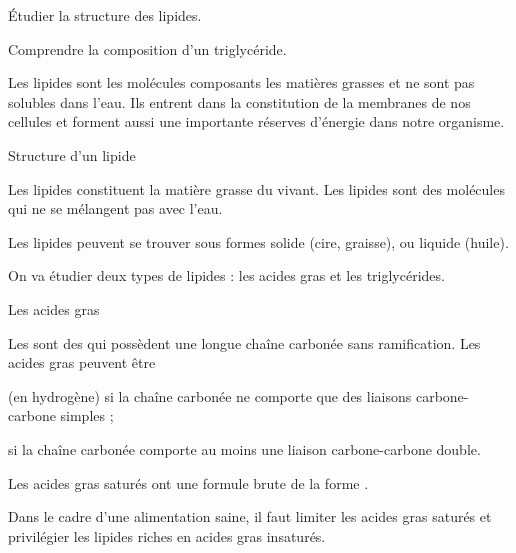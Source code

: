 \tetePremStssBiol
\vspace*{-36pt}


\begin{objectifs}
  \item Étudier la structure des lipides.
  \item Comprendre la composition d'un triglycéride.
\end{objectifs}

\begin{contexte}
  Les lipides sont les molécules composants les matières grasses et ne sont pas solubles dans l'eau.
  Ils entrent dans la constitution de la membranes de nos cellules et forment aussi une importante réserves d'énergie dans notre organisme.

\end{contexte}


\begin{doc}{Structure d'un lipide}
  \begin{importants}
    Les lipides constituent la matière grasse du vivant.
    Les lipides sont des molécules  qui ne se mélangent pas avec l'eau.
  \end{importants}
  Les lipides peuvent se trouver sous formes solide (cire, graisse), ou liquide (huile).
  
  On va étudier deux types de lipides : les acides gras et les triglycérides.
\end{doc}

\begin{doc}{Les acides gras}
  \begin{importants}
    Les  sont des  qui possèdent une longue chaîne carbonée sans ramification.
    Les acides gras peuvent être 
    \begin{listePoints}
      \item {} (en hydrogène) si la chaîne carbonée ne comporte que des liaisons carbone-carbone simples ;
      \item {} si la chaîne carbonée comporte au moins une liaison carbone-carbone double.
    \end{listePoints}
  \end{importants}
  
  \begin{multicols}{2}
    \centering

  \end{multicols}

  Les acides gras saturés ont une formule brute de la forme .

  Dans le cadre d'une alimentation saine, il faut limiter les acides gras saturés et privilégier les lipides riches en acides gras insaturés.
\end{doc}

